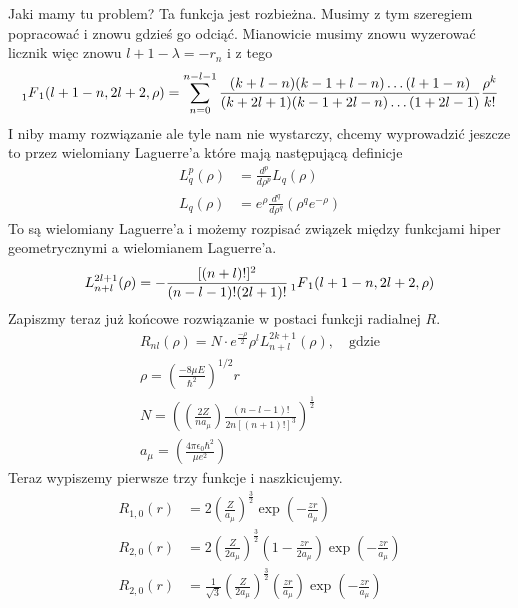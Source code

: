 Jaki mamy tu problem? Ta funkcja jest rozbieżna. Musimy z tym szeregiem popracować i znowu gdzieś go odciąć. Mianowicie musimy znowu wyzerować licznik więc znowu $l + 1 - \lambda = -r_n$ i z tego
\begin{equation*}
	\prescript{}{1}{F}_{1}(l + 1 - n, 2l+2, \rho) = \sum_{n=0}^{n - l -1} \frac{(k+l - n)(k -1+l-n)\dots(l+1-n)}{(k+2l+1)(k-1+2l - n)\dots(1 + 2l - 1)} \frac{\rho^k}{k!}
\end{equation*}
I niby mamy rozwiązanie ale tyle nam nie wystarczy, chcemy wyprowadzić jeszcze to przez wielomiany Laguerre'a które mają następującą definicje
\begin{equation*}
	\begin{split}
		L_q^p(\rho)&= \frac{d^p}{d \rho^p}L_q(\rho) \\
		L_q(\rho) &= e^{\rho} \frac{d^q}{d \rho^q}\left(\rho^q e^{-\rho}\right)
	\end{split}
\end{equation*}
To są wielomiany Laguerre'a i możemy rozpisać związek między funkcjami hiper geometrycznymi a wielomianem Laguerre'a.
\begin{equation*}
	L_{n+l}^{2l+1}(\rho) = -\frac{[(n+l)!]^2}{(n-l-1)!(2l+1)!} \prescript{}{1}{F}_{1}(l + 1 - n, 2l+2, \rho) 
\end{equation*}
Zapiszmy teraz już końcowe rozwiązanie w postaci funkcji radialnej $R$.
\begin{equation*}
	\begin{gathered}
		R_{n l}(\rho)=N \cdot e^{\frac{-\rho}{2}} \rho^{l} L_{n+l}^{2 k+1}(\rho), \quad \text{gdzie} \\
		\rho=\left(\frac{-8\mu E}{\hbar^2}\right)^{1/2}r \\
		N = \left( \left( \frac{2Z}{n a_{\mu}} \right) \frac{(n - l - 1)!}{2n[(n+1)!]^3} \right)^{\frac{1}{2}} \\
		a_{\mu} = \left(\frac{4 \pi \epsilon_0 \hbar^2}{\mu e^2}\right)
	\end{gathered}
\end{equation*}
Teraz wypiszemy pierwsze trzy funkcje i naszkicujemy.
\begin{equation*}
	\begin{split}
		R_{1,0}(r) &=  2 \left(\frac{Z}{a_{\mu}}\right)^{\frac32} \exp(-\frac{zr}{a_{\mu}}) \\
		R_{2,0}(r) &=  2 \left(\frac{Z}{2a_{\mu}}\right)^{\frac32}\left(1 - \frac{zr}{2a_{\mu}}\right) \exp(-\frac{zr}{a_{\mu}}) \\
		R_{2,0}(r) &=  \frac{1}{\sqrt{3}} \left(\frac{Z}{2a_{\mu}}\right)^{\frac32} \left(\frac{zr}{a_{\mu}}\right) \exp(-\frac{zr}{a_{\mu}})
	\end{split}
\end{equation*}
